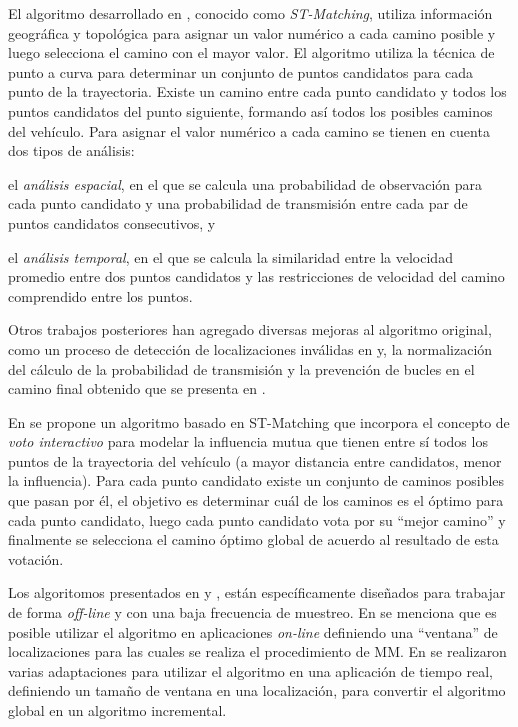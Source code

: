El algoritmo desarrollado en \cite{lou2009map}, conocido como \emph{ST-Matching}, utiliza información geográfica y topológica para asignar un valor numérico a cada camino posible y luego selecciona el camino con el mayor valor. El algoritmo utiliza la técnica de punto a curva para determinar un conjunto de puntos candidatos para cada punto de la trayectoria. Existe un camino entre cada punto candidato y todos los puntos candidatos del punto siguiente, formando así todos los posibles caminos del vehículo. Para asignar el valor numérico a cada camino se tienen en cuenta dos tipos de análisis: \begin{enumerate*}[a)] \item el \emph{análisis espacial}, en el que se calcula una probabilidad de observación para cada punto candidato y una probabilidad de transmisión entre cada par de puntos candidatos consecutivos, y \item el \emph{análisis temporal}, en el que se calcula la similaridad entre la velocidad promedio entre dos puntos candidatos y las restricciones de velocidad del camino comprendido entre los puntos.\end{enumerate*} Otros trabajos posteriores han agregado diversas mejoras al algoritmo original, como un proceso de detección de localizaciones inválidas en  \cite{sakic2012map} y, la normalización del cálculo de la probabilidad de transmisión y la prevención de bucles en el camino final obtenido que se presenta en  \cite{budigm2012algorithm}.

En \cite{yuan2010interactive} se propone un algoritmo basado en ST-Matching que incorpora el concepto de \emph{voto interactivo} para modelar la influencia mutua que tienen entre sí todos los puntos de la trayectoria del vehículo (a mayor distancia entre candidatos, menor la influencia). Para cada punto candidato existe un conjunto de caminos posibles que pasan por él, el objetivo es determinar cuál de los caminos es el óptimo para cada punto candidato, luego cada punto candidato vota por su “mejor camino” y finalmente se selecciona el camino óptimo global de acuerdo al resultado de esta votación.

Los algoritomos presentados en \cite{lou2009map} y \cite{yuan2010interactive}, están específicamente diseñados para trabajar de forma \emph{off-line} y con una baja frecuencia de muestreo. En \cite{lou2009map} se  menciona que es posible utilizar el algoritmo en aplicaciones \emph{on-line} definiendo una “ventana” de localizaciones para las cuales se realiza el procedimiento de MM. En \cite{sakic2012map} se realizaron varias adaptaciones para utilizar el algoritmo en una aplicación de tiempo real, definiendo un tamaño de ventana en una localización, para convertir el algoritmo global en un algoritmo incremental.

